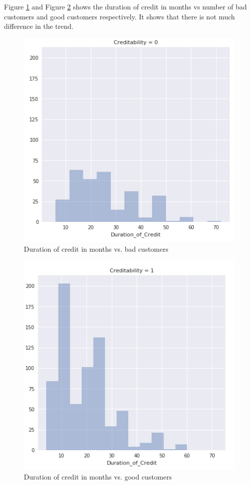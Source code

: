 \documentclass[sigconf]{acmart}
\begin{document}
Figure \ref{fig:Figure11} and Figure \ref{fig:Figure12} shows the duration of credit in months vs number of bad customers and good customers respectively. It shows that there is not much difference in the trend.

\begin{figure}[htb]
  \centering
  \includegraphics[width=1.0\columnwidth]{images/Figure11.png}
  \caption{Duration of credit in months vs. bad customers}
  \label{fig:Figure11} 
\end{figure}

\begin{figure}[htb]
  \centering
  \includegraphics[width=1.0\columnwidth]{images/Figure12.png}
  \caption{Duration of credit in months vs. good customers}
  \label{fig:Figure12} 
\end{figure}
\end{document}
